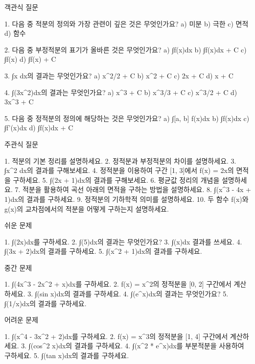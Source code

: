 \documentclass[fleqn]{article}
\begin{document}
      
         객관식 질문

1. 다음 중 적분의 정의와 가장 관련이 깊은 것은 무엇인가요?
   a) 미분  
   b) 극한  
   c) 면적  
   d) 함수  

2. 다음 중 부정적분의 표기가 올바른 것은 무엇인가요?
   a) ∫f(x)dx  
   b) ∫f(x)dx + C  
   c) ∫f(x)  
   d) ∫f(x) + C  

3. ∫x dx의 결과는 무엇인가요?
   a) x^2/2 + C  
   b) x^2 + C  
   c) 2x + C  
   d) x + C  

4. ∫(3x^2)dx의 결과는 무엇인가요?
   a) x^3 + C  
   b) x^3/3 + C  
   c) x^3/2 + C  
   d) 3x^3 + C  

5. 다음 중 정적분의 정의에 해당하는 것은 무엇인가요?
   a) ∫[a, b] f(x)dx  
   b) ∫f(x)dx  
   c) ∫f'(x)dx  
   d) ∫f(x)dx + C  

 주관식 질문

1. 적분의 기본 정리를 설명하세요.
2. 정적분과 부정적분의 차이를 설명하세요.
3. ∫x^2 dx의 결과를 구해보세요.
4. 정적분을 이용하여 구간 [1, 3]에서 f(x) = 2x의 면적을 구하세요.
5. ∫(2x + 1)dx의 결과를 구해보세요.
6. 평균값 정리의 개념을 설명하세요.
7. 적분을 활용하여 곡선 아래의 면적을 구하는 방법을 설명하세요.
8. ∫(x^3 - 4x + 1)dx의 결과를 구하세요.
9. 정적분의 기하학적 의미를 설명하세요.
10. 두 함수 f(x)와 g(x)의 교차점에서의 적분을 어떻게 구하는지 설명하세요.

 쉬운 문제

1. ∫(2x)dx를 구하세요.
2. ∫(5)dx의 결과는 무엇인가요?
3. ∫(x)dx 결과를 쓰세요.
4. ∫(3x + 2)dx의 결과를 구하세요.
5. ∫(x^2 + 1)dx의 결과를 구하세요.

 중간 문제

1. ∫(4x^3 - 2x^2 + x)dx를 구하세요.
2. f(x) = x^2의 정적분을 [0, 2] 구간에서 계산하세요.
3. ∫(sin x)dx의 결과를 구하세요.
4. ∫(e^x)dx의 결과는 무엇인가요?
5. ∫(1/x)dx의 결과를 구하세요.

 어려운 문제

1. ∫(x^4 - 3x^2 + 2)dx를 구하세요.
2. f(x) = x^3의 정적분을 [1, 4] 구간에서 계산하세요.
3. ∫(cos^2 x)dx의 결과를 구하세요.
4. ∫(x^2 * e^x)dx를 부분적분을 사용하여 구하세요.
5. ∫(tan x)dx의 결과를 구하세요.

      
        
\end{document}
